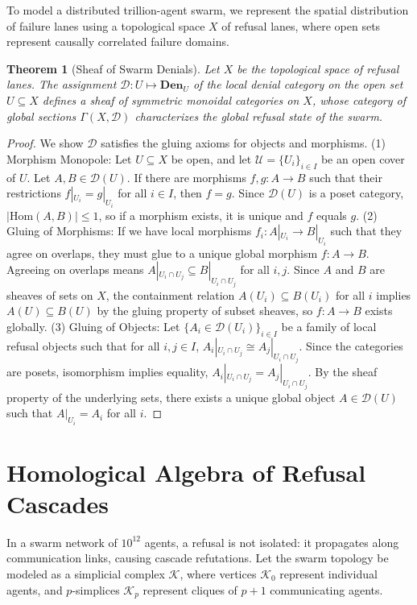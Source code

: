 \documentclass[11pt,oneside]{book}
\theoremstyle{definition}
\theoremstyle{plain}
\newtheorem{theorem}{Theorem}[chapter]
\theoremstyle{remark}
\begin{document}
To model a distributed trillion-agent swarm, we represent the spatial distribution of failure lanes using a topological space $X$ of refusal lanes, where open sets represent causally correlated failure domains. %

\begin{theorem}[Sheaf of Swarm Denials]\label{thm:sheaf_denial}
Let $X$ be the topological space of refusal lanes. %
The assignment $\mathcal{D}: U \mapsto \mathbf{Den}_U$ of the local denial category on the open set $U \subseteq X$ defines a sheaf of symmetric monoidal categories on $X$, whose category of global sections $\Gamma(X, \mathcal{D})$ characterizes the global refusal state of the swarm. %
\end{theorem}

\begin{proof}
We show $\mathcal{D}$ satisfies the gluing axioms for objects and morphisms. %
(1) Morphism Monopole: Let $U \subseteq X$ be open, and let $\mathcal{U} = \{U_i\}_{i \in I}$ be an open cover of $U$. %
Let $A, B \in \mathcal{D}(U)$. %
If there are morphisms $f, g: A \to B$ such that their restrictions $f|_{U_i} = g|_{U_i}$ for all $i \in I$, then $f = g$. %
Since $\mathcal{D}(U)$ is a poset category, $|\text{Hom}(A, B)| \le 1$, so if a morphism exists, it is unique and $f$ equals $g$. %
(2) Gluing of Morphisms: If we have local morphisms $f_i: A|_{U_i} \to B|_{U_i}$ such that they agree on overlaps, they must glue to a unique global morphism $f: A \to B$. %
Agreeing on overlaps means $A|_{U_i \cap U_j} \subseteq B|_{U_i \cap U_j}$ for all $i, j$. %
Since $A$ and $B$ are sheaves of sets on $X$, the containment relation $A(U_i) \subseteq B(U_i)$ for all $i$ implies $A(U) \subseteq B(U)$ by the gluing property of subset sheaves, so $f: A \to B$ exists globally. %
(3) Gluing of Objects: Let $\{A_i \in \mathcal{D}(U_i)\}_{i \in I}$ be a family of local refusal objects such that for all $i, j \in I$, $A_i|_{U_i \cap U_j} \cong A_j|_{U_i \cap U_j}$. %
Since the categories are posets, isomorphism implies equality, $A_i|_{U_i \cap U_j} = A_j|_{U_i \cap U_j}$. %
By the sheaf property of the underlying sets, there exists a unique global object $A \in \mathcal{D}(U)$ such that $A|_{U_i} = A_i$ for all $i$. %
\end{proof}

\section{Homological Algebra of Refusal Cascades}
In a swarm network of $10^{12}$ agents, a refusal is not isolated: it propagates along communication links, causing cascade refutations. %
Let the swarm topology be modeled as a simplicial complex $\mathcal{K}$, where vertices $\mathcal{K}_0$ represent individual agents, and $p$-simplices $\mathcal{K}_p$ represent cliques of $p+1$ communicating agents. %
\end{document}
